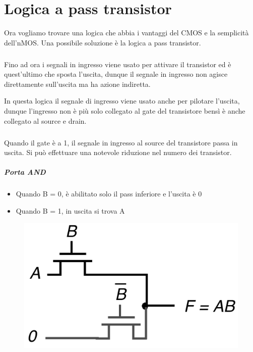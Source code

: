 \chapter{Logica a pass transistor}

Ora vogliamo trovare una logica che abbia i vantaggi del CMOS e la semplicità dell'nMOS. Una possibile soluzione è la logica a pass transistor.

\paragraph{}
Fino ad ora i segnali in ingresso viene usato per attivare il transistor ed è quest'ultimo che  sposta l'uscita, dunque il segnale in ingresso non agisce direttamente sull'uscita ma ha azione indiretta.

In questa logica il segnale di ingresso viene usato anche per pilotare l'uscita, dunque l'ingresso non è più solo collegato al gate del transistore bensì è anche collegato al source e drain.

\paragraph{}

Quando il gate	è a	1,	il segnale in	ingresso al	source	del	
transistore passa in	uscita. Si	può effettuare una notevole riduzione nel numero dei
transistor.

\paragraph{Porta AND}


\begin{itemize}
    \item Quando B	=	0,	è abilitato solo	il pass inferiore e	l'uscita è 0
    \item Quando B	=	1,	in	uscita si trova A
\end{itemize}

\begin{figure}[htbp]
    \centering
    \includegraphics[width=0.35\linewidth]{img/and_pass.png}
    
    
\end{figure}


